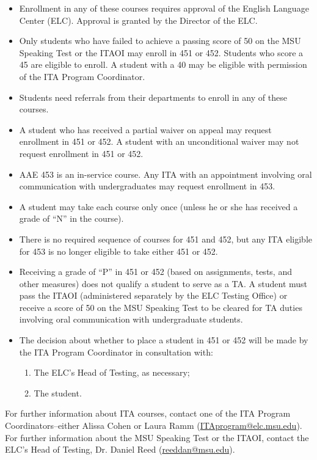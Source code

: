 \begin{itemize}

\item Enrollment in any of these courses requires approval of the English Language Center (ELC). Approval is granted by the Director of the ELC.
\item Only students who have failed to achieve a passing score of 50 on the MSU Speaking Test or the ITAOI may enroll in 451 or 452. Students who score a 45 are eligible to enroll.  A student with a 40 may be eligible with permission of the ITA Program Coordinator.  
\item Students need referrals from their departments to enroll in any of these courses.
\item A student who has received a partial waiver on appeal may request enrollment in 451 or 452. A student with an unconditional waiver may not request enrollment in 451 or 452.
\item AAE 453 is an in-service course. Any ITA with an appointment involving oral communication with undergraduates may request enrollment in 453.
\item A student may take each course only once (unless he or she has received a grade of “N” in the course).
\item There is no required sequence of courses for 451 and 452, but any ITA eligible for 453 is no longer eligible to take either 451 or 452.
\item Receiving a grade of ``P'' in 451 or 452 (based on assignments, tests, and other measures) does not qualify a student to serve as a TA. A student must pass the ITAOI (administered separately by the ELC Testing Office) or receive a score of 50 on the MSU Speaking Test to be cleared for TA duties involving oral communication with undergraduate students. 
\item The decision about whether to place a student in 451 or 452
will be made by the ITA Program Coordinator in consultation with:
\begin{enumerate}
\item The ELC’s Head of Testing, as necessary;  
\item The student.
\end{enumerate}
\end{itemize}

For further information about ITA courses, contact one of the ITA
Program Coordinators--either Alissa Cohen or Laura Ramm
(\href{mailto:ITAprogram@elc.msu.edu}{ITAprogram@elc.msu.edu}).  For
further information about the MSU Speaking Test or the ITAOI, contact
the ELC’s Head of Testing, Dr. Daniel Reed
(\href{mailto:reeddan@msu.edu}{reeddan@msu.edu}).


